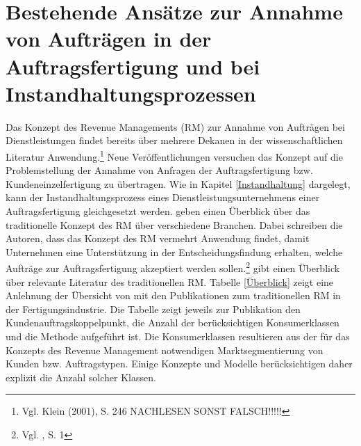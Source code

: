 \chapter{Bestehende Ansätze zur Annahme von Aufträgen in der Auftragsfertigung und bei Instandhaltungsprozessen}\label{Review}
\setcounter{footnote}{4}  %

Das Konzept des Revenue Managements (RM) zur Annahme von Aufträgen bei Dienstleistungen findet bereits über mehrere Dekanen in der wissenschaftlichen Literatur Anwendung.\footnote{Vgl. Klein (2001), S. 246 NACHLESEN SONST FALSCH!!!!!} Neue Veröffentlichungen versuchen das Konzept auf die Problemstellung der Annahme von Anfragen der Auftragsfertigung bzw. Kundeneinzelfertigung zu übertragen. Wie in Kapitel \ref{Instandhaltung} dargelegt, kann der Instandhaltungsprozess eines Dienstleistungsunternehmens einer Auftragsfertigung gleichgesetzt werden. \cite{kimms2005revenue} geben einen Überblick über das traditionelle Konzept des RM über verschiedene Branchen. Dabei schreiben die Autoren, dass das Konzept des RM vermehrt Anwendung findet, damit Unternehmen eine Unterstützung in der Entscheidungsfindung erhalten, welche Aufträge zur Auftragsfertigung akzeptiert werden sollen.\footnote{Vgl. \cite{kimms2005revenue}, S. 1} \cite{quante2009management} gibt einen Überblick über relevante Literatur des traditionellen RM. Tabelle \ref{Überblick} zeigt eine Anlehnung der Übersicht von \cite{quante2009management} mit den Publikationen zum traditionellen RM in der Fertigungsindustrie. Die Tabelle zeigt jeweils zur Publikation den Kundenauftragskoppelpunkt, die Anzahl der berücksichtigen Konsumerklassen und die Methode aufgeführt ist. Die Konsumerklassen resultieren aus der für das Konzepts des Revenue Management notwendigen Marktsegmentierung von Kunden bzw. Auftragstypen. Einige Konzepte und Modelle berücksichtigen daher explizit die Anzahl solcher Klassen.

